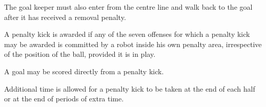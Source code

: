 \documentclass[12pt]{hurocup}
\begin{document}
\begin{decisions}
\item The goal keeper must also enter from the centre line and walk
  back to the goal after it has received a removal penalty.
\end{decisions}

\label{law:penalty-kick}

\begin{lawlist}[US]
  
\item A penalty kick is awarded if any of the seven offenses for which
  a penalty kick may be awarded is committed by a robot inside his own
  penalty area, irrespective of the position of the ball, provided it
  is in play.
  
\item A goal may be scored directly from a penalty kick.
  
\item Additional time is allowed for a penalty kick to be taken at the
  end of each half or at the end of periods of extra time.
  

\end{lawlist}
\end{document}
